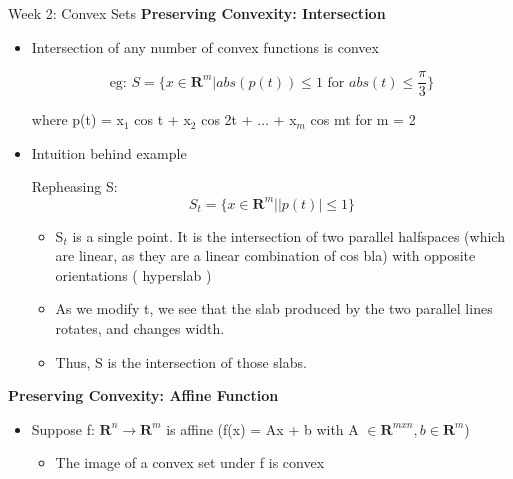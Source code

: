 \documentclass{article}
\begin{document}
\begin{homeworkProblemName}{{\LARGE Week 2: Convex Sets}}
  \vspace{0.2 cm} \textbf{\large Preserving Convexity: Intersection}

  \begin{problemAnswer}{
      \begin{itemize}
      \item Intersection of any number of convex functions is convex

        \[\text{eg: } S = \{x \in \bm{R}^m | abs(p(t)) \leq 1 \text{ for } abs(t) \leq
          \frac{\pi}{3}\}\]

        where p(t) = x$_1$ cos t + x$_2$ cos 2t + ... + x$_m$ cos mt for m = 2

      \item Intuition behind example

         Repheasing S: \[S_t = \{x \in \bm{R}^m | |p(t)| \leq 1\}\]

         \begin{itemize}
         \item S$_t$ is a single point. It is the intersection of two parallel
           halfspaces (which are linear, as they are a linear combination of cos
           bla) with opposite orientations (
           hyperslab )

         \item As we modify t, we see that the slab produced by the two parallel lines
           rotates, and changes width.

         \item Thus, S is the intersection of those slabs.

         \end{itemize}
      \end{itemize}
    }\end{problemAnswer}

  \clearpage

  \vspace{0.2 cm} \textbf{\large Preserving Convexity: Affine Function}

  \begin{problemAnswer}{
      \begin{itemize}
      \item Suppose f: $\bm{R}^n \to \bm{R}^m$ is affine (f(x) = Ax + b with A $\in
        \bm{R}^{m x n}, b \in \bm{R}^m$)

        \begin{itemize}
        \item The image of a convex set under f is convex


\end{itemize}
\end{itemize}}
\end{problemAnswer}
\end{homeworkProblemName}
\end{document}
